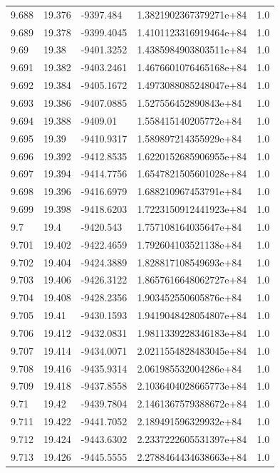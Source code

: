 \begin{tabular}{lllll}
9.688 & 19.376 & -9397.484 & 1.3821902367379271e+84 & 1.0 \\
9.689 & 19.378 & -9399.4045 & 1.4101123316919464e+84 & 1.0 \\
9.69 & 19.38 & -9401.3252 & 1.4385984903803511e+84 & 1.0 \\
9.691 & 19.382 & -9403.2461 & 1.4676601076465168e+84 & 1.0 \\
9.692 & 19.384 & -9405.1672 & 1.4973088085248047e+84 & 1.0 \\
9.693 & 19.386 & -9407.0885 & 1.527556452890843e+84 & 1.0 \\
9.694 & 19.388 & -9409.01 & 1.558415140205772e+84 & 1.0 \\
9.695 & 19.39 & -9410.9317 & 1.589897214355929e+84 & 1.0 \\
9.696 & 19.392 & -9412.8535 & 1.6220152685906955e+84 & 1.0 \\
9.697 & 19.394 & -9414.7756 & 1.6547821505601028e+84 & 1.0 \\
9.698 & 19.396 & -9416.6979 & 1.688210967453791e+84 & 1.0 \\
9.699 & 19.398 & -9418.6203 & 1.7223150912441923e+84 & 1.0 \\
9.7 & 19.4 & -9420.543 & 1.757108164035647e+84 & 1.0 \\
9.701 & 19.402 & -9422.4659 & 1.792604103521138e+84 & 1.0 \\
9.702 & 19.404 & -9424.3889 & 1.828817108549693e+84 & 1.0 \\
9.703 & 19.406 & -9426.3122 & 1.8657616648062727e+84 & 1.0 \\
9.704 & 19.408 & -9428.2356 & 1.903452550605876e+84 & 1.0 \\
9.705 & 19.41 & -9430.1593 & 1.9419048428054807e+84 & 1.0 \\
9.706 & 19.412 & -9432.0831 & 1.9811339228346183e+84 & 1.0 \\
9.707 & 19.414 & -9434.0071 & 2.0211554828483045e+84 & 1.0 \\
9.708 & 19.416 & -9435.9314 & 2.061985532004286e+84 & 1.0 \\
9.709 & 19.418 & -9437.8558 & 2.1036404028665773e+84 & 1.0 \\
9.71 & 19.42 & -9439.7804 & 2.1461367579388672e+84 & 1.0 \\
9.711 & 19.422 & -9441.7052 & 2.189491596329932e+84 & 1.0 \\
9.712 & 19.424 & -9443.6302 & 2.2337222605531397e+84 & 1.0 \\
9.713 & 19.426 & -9445.5555 & 2.2788464434638663e+84 & 1.0 \\

\end{tabular}
